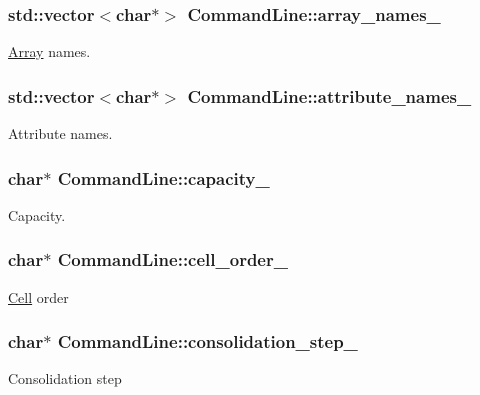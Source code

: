 \subsubsection[{array\+\_\+names\+\_\+}]{\setlength{\rightskip}{0pt plus 5cm}std\+::vector$<$char$\ast$$>$ Command\+Line\+::array\+\_\+names\+\_\+}\label{classCommandLine_ac33bfae7756e68fa2f7fc2538cf4a8ac}
\hyperlink{classArray}{Array} names. \hypertarget{classCommandLine_ad900ef70d91535497ecedc948254805a}{}
\subsubsection[{attribute\+\_\+names\+\_\+}]{\setlength{\rightskip}{0pt plus 5cm}std\+::vector$<$char$\ast$$>$ Command\+Line\+::attribute\+\_\+names\+\_\+}\label{classCommandLine_ad900ef70d91535497ecedc948254805a}
Attribute names. \hypertarget{classCommandLine_a4b2c6066274035a5bea2adcbe71bcfa3}{}
\subsubsection[{capacity\+\_\+}]{\setlength{\rightskip}{0pt plus 5cm}char$\ast$ Command\+Line\+::capacity\+\_\+}\label{classCommandLine_a4b2c6066274035a5bea2adcbe71bcfa3}
Capacity. \hypertarget{classCommandLine_a881b548c171d82e592d19b8f91b7c4fe}{}
\subsubsection[{cell\+\_\+order\+\_\+}]{\setlength{\rightskip}{0pt plus 5cm}char$\ast$ Command\+Line\+::cell\+\_\+order\+\_\+}\label{classCommandLine_a881b548c171d82e592d19b8f91b7c4fe}
\hyperlink{classCell}{Cell} order \hypertarget{classCommandLine_abb7c1c0a9693309c885c69c7d8243215}{}
\subsubsection[{consolidation\+\_\+step\+\_\+}]{\setlength{\rightskip}{0pt plus 5cm}char$\ast$ Command\+Line\+::consolidation\+\_\+step\+\_\+}\label{classCommandLine_abb7c1c0a9693309c885c69c7d8243215}
Consolidation step \hypertarget{classCommandLine_abe5adf7e0e46e33bbacab8def5146d54}{}
